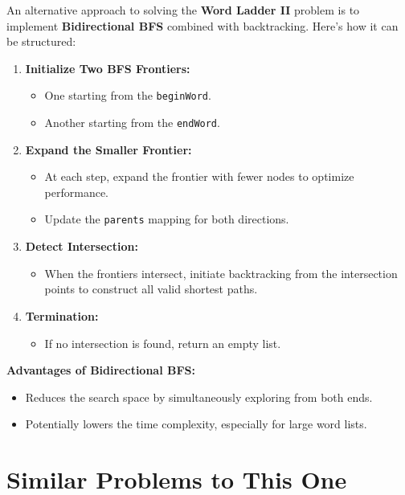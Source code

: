 An alternative approach to solving the \textbf{Word Ladder II} problem is to implement \textbf{Bidirectional BFS} combined with backtracking. Here's how it can be structured:

\begin{enumerate}
    \item \textbf{Initialize Two BFS Frontiers:}
    \begin{itemize}
        \item One starting from the \texttt{beginWord}.
        \item Another starting from the \texttt{endWord}.
    \end{itemize}
    
    \item \textbf{Expand the Smaller Frontier:}
    \begin{itemize}
        \item At each step, expand the frontier with fewer nodes to optimize performance.
        \item Update the \texttt{parents} mapping for both directions.
    \end{itemize}
    
    \item \textbf{Detect Intersection:}
    \begin{itemize}
        \item When the frontiers intersect, initiate backtracking from the intersection points to construct all valid shortest paths.
    \end{itemize}
    
    \item \textbf{Termination:}
    \begin{itemize}
        \item If no intersection is found, return an empty list.
    \end{itemize}
\end{enumerate}

\textbf{Advantages of Bidirectional BFS:}
\begin{itemize}
    \item Reduces the search space by simultaneously exploring from both ends.
    \item Potentially lowers the time complexity, especially for large word lists.
\end{itemize}

\section*{Similar Problems to This One}

